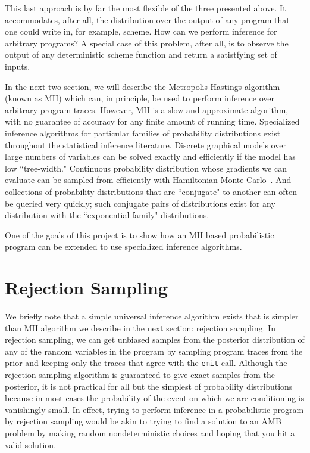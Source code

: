 \documentclass{article}
\begin{document}
This last approach is by far the most flexible of the three presented above. It
accommodates, after all, the distribution over the output of any program that one
could write in, for example, scheme. How can we perform inference for arbitrary
programs? A special case of this problem, after all, is to observe the output of
any deterministic scheme function and return a satistfying set of inputs.

In the next two section, we will describe the Metropolis-Hastings algorithm
(known as MH) which can, in principle, be used to perform inference over
arbitrary program traces. However, MH is a slow and approximate algorithm, with
no guarantee of accuracy for any finite amount of running time. Specialized
inference algorithms for particular families of probability distributions exist
throughout the statistical inference literature. Discrete graphical models over
large numbers of variables can be solved exactly and efficiently if the model
has low ``tree-width." Continuous probability distribution whose gradients we can
evaluate can be sampled from efficiently with Hamiltonian Monte Carlo~\cite{duane1987hybrid}.
And collections of probability distributions that are ``conjugate" to another
can often be queried very quickly; such conjugate pairs of distributions exist
for any distribution with the ``exponential family" distributions.

One of the goals of this project is to show how an MH based probabilistic
program can be extended to use specialized inference algorithms. 

\section{Rejection Sampling}
We briefly note that a simple universal inference algorithm exists that is
simpler than MH algorithm we describe in the next section: rejection sampling.
In rejection sampling, we can get unbiased samples from the posterior
distribution of any of the random variables in the program by sampling program
traces from the prior and keeping only the traces that agree with the
\verb+emit+ call. Although the rejection sampling algorithm is
guaranteed to give exact samples from the posterior, it is not practical for
all but the simplest of probability  distributions because in most cases the
probability of the event on which we are conditioning is vanishingly small. In
effect, trying to perform inference in a probabilistic program by rejection
sampling would be akin to trying to find a solution to an AMB problem by making
random nondeterministic choices and hoping that you hit a valid solution.
\end{document}

